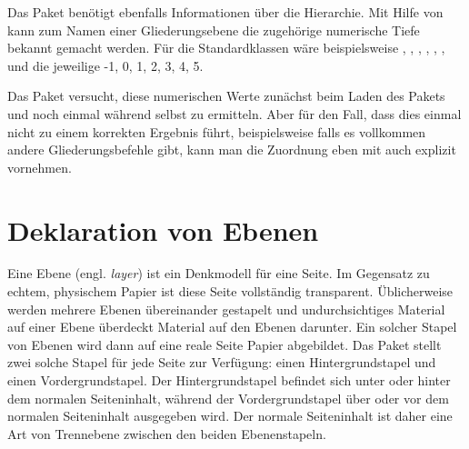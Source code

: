 {\setlength{\emergencystretch}{1em}%
Das Paket  benötigt ebenfalls Informationen über die
Hierarchie. Mit Hilfe von  kann
 zum Namen einer Gliederungsebene die zugehörige numerische
Tiefe bekannt gemacht werden. Für die Standardklassen wäre  beispielsweise , ,
, , ,
,  und die jeweilige
 -1, 0, 1, 2, 3, 4, 5.\par}

Das Paket  versucht, diese numerischen Werte zunächst beim
Laden des Pakets und noch einmal während 
selbst zu ermitteln. Aber für den Fall, dass dies einmal nicht zu einem
korrekten Ergebnis führt, beispielsweise falls es vollkommen andere
Gliederungsbefehle gibt, kann man die Zuordnung eben mit
 auch explizit vornehmen.%
%
\EndIndexGroup


\section{Deklaration von Ebenen}

Eine Ebene (engl. \emph{layer}) ist ein Denkmodell für eine Seite. Im
Gegensatz zu echtem, physischem Papier ist diese Seite vollständig
transparent. Üblicherweise werden mehrere Ebenen übereinander gestapelt und
undurchsichtiges Material auf einer Ebene überdeckt Material auf den Ebenen
darunter. Ein solcher Stapel von Ebenen wird dann auf eine reale Seite Papier
abgebildet. Das Paket  stellt zwei solche Stapel für jede
Seite zur Verfügung: einen Hintergrundstapel und einen Vordergrundstapel. Der
Hintergrundstapel befindet sich unter oder hinter dem normalen Seiteninhalt,
während der Vordergrundstapel über oder vor dem normalen Seiteninhalt
ausgegeben wird. Der normale Seiteninhalt ist daher eine Art von Trennebene
zwischen den beiden Ebenenstapeln.

